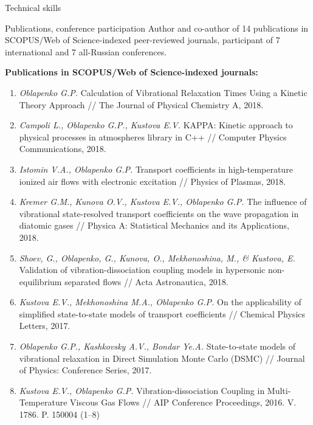 \documentclass{resume} %
\begin{document}
\begin{rSection}{Technical skills}
\pagebreak

\begin{rSection}{Publications, conference participation}
Author and co-author of 14 publications in SCOPUS/Web of Science-indexed peer-reviewed journals, participant of 7 international and 7 all-Russian conferences.

{\bf Publications in SCOPUS/Web of Science-indexed journals:}

\begin{enumerate}

\item \emph{Oblapenko G.P.} Calculation of Vibrational Relaxation Times Using a Kinetic Theory Approach // The Journal of Physical Chemistry A, 2018.

\item \emph{Campoli L., Oblapenko G.P., Kustova E.V.} KAPPA: Kinetic approach to physical processes in atmospheres library in C++ // Computer Physics Communications, 2018.

\item \emph{Istomin V.A., Oblapenko G.P.} Transport coefficients in high-temperature ionized air flows with electronic excitation // Physics of Plasmas, 2018.

\item \emph{Kremer G.M., Kunova O.V., Kustova E.V., Oblapenko G.P.} The influence of vibrational state-resolved transport coefficients on the wave propagation in diatomic gases // Physica A: Statistical Mechanics and its Applications, 2018.

\item \emph{Shoev, G., Oblapenko, G., Kunova, O., Mekhonoshina, M., \& Kustova, E.} Validation of vibration-dissociation coupling models in hypersonic non-equilibrium separated flows // Acta Astronautica, 2018.

\item \emph{Kustova E.V., Mekhonoshina M.A., Oblapenko G.P.} On the applicability of simplified state-to-state models of transport coefficients // Chemical Physics Letters, 2017.

\item \emph{Oblapenko G.P., Kashkovsky A.V., Bondar Ye.A.} State-to-state models of vibrational relaxation in Direct Simulation Monte Carlo (DSMC) // Journal of Physics: Conference Series, 2017.

\item  \emph{Kustova E.V., Oblapenko G.P.} Vibration-dissociation Coupling in Multi-Temperature Viscous Gas Flows // AIP Conference Proceedings, 2016. V. 1786. P. 150004 (1–8)


\end{enumerate}
\end{rSection}
\end{rSection}
\end{document}
